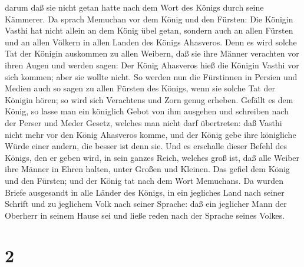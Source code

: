 darum daß sie nicht getan hatte nach dem Wort des Königs durch seine
Kämmerer.  Da sprach Memuchan vor dem König und den
Fürsten: Die Königin Vasthi hat nicht allein an dem König übel getan,
sondern auch an allen Fürsten und an allen Völkern in allen Landen des
Königs Ahasveros.  Denn es wird solche Tat der Königin
auskommen zu allen Weibern, daß sie ihre Männer verachten vor ihren
Augen und werden sagen: Der König Ahasveros hieß die Königin Vasthi vor
sich kommen; aber sie wollte nicht.  So werden nun die
Fürstinnen in Persien und Medien auch so sagen zu allen Fürsten des
Königs, wenn sie solche Tat der Königin hören; so wird sich Verachtens
und Zorn genug erheben.  Gefällt es dem König, so lasse man
ein königlich Gebot von ihm ausgehen und schreiben nach der Perser und
Meder Gesetz, welches man nicht darf übertreten: daß Vasthi nicht mehr
vor den König Ahasveros komme, und der König gebe ihre königliche Würde
einer andern, die besser ist denn sie.  Und es erschalle
dieser Befehl des Königs, den er geben wird, in sein ganzes Reich,
welches groß ist, daß alle Weiber ihre Männer in Ehren halten, unter
Großen und Kleinen.  Das gefiel dem König und den Fürsten;
und der König tat nach dem Wort Memuchans.  Da wurden
Briefe ausgesandt in alle Länder des Königs, in ein jegliches Land nach
seiner Schrift und zu jeglichem Volk nach seiner Sprache: daß ein
jeglicher Mann der Oberherr in seinem Hause sei und ließe reden nach der
Sprache seines Volkes.

\hypertarget{section-1}{%
\section{2}\label{section-1}}

